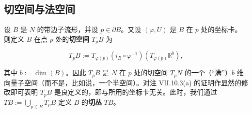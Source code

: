 \subsection*{切空间与法空间}

设 $ B $ 是 $ N $ 的带边子流形，并设 $ p \in \partial B $。又设 $ (\varphi,U) $ 是 $ B $ 在 $ p $ 处的坐标卡。则定义 $ B $ 在点 $ p $ 处的\textbf{切空间} $ T_pB $ 为

\[
T_pB := T_{\varphi(p)}(i_B\circ\varphi^{-1})(T_{\varphi(p)}\mathbb{R}^b) ,
\]

其中 $ b := \dim(B) $。因此 $ T_pB $ 是 $ N $ 在 $ p $ 处的切空间 $ T_pN $ 的一个（“满”）$ b $ 维向量子空间（而不是，比如说，一个半空间）。对注 VII.10.3(a) 的证明作显然的修改即可表明 $ T_pB $ 是良定义的，即与所用的坐标卡无关。此时，我们通过 $ TB := \bigcup_{p\in B}T_pB $ 定义 $ B $ 的\textbf{切丛} $ TB $。


